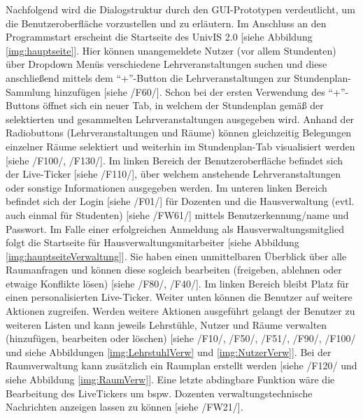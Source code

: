 Nachfolgend wird die Dialogstruktur durch den GUI-Prototypen verdeutlicht, um die Benutzeroberfläche vorzustellen und zu erläutern.
Im Anschluss an den Programmstart erscheint die Startseite des UnivIS 2.0 [siehe Abbildung \ref{img:hauptseite}]. Hier können unangemeldete Nutzer (vor allem Stundenten) über Dropdown Menüs verschiedene Lehrveranstaltungen suchen und diese anschließend mittels dem "`+"'-Button die Lehrveranstaltungen zur Stundenplan-Sammlung hinzufügen  [siehe /F60/]. Schon bei der ersten Verwendung des "`+"'-Buttons öffnet sich ein neuer Tab, in welchem der Stundenplan gemäß der selektierten und gesammelten Lehrveranstaltungen ausgegeben wird. Anhand der Radiobuttons (Lehrveranstaltungen und Räume) können gleichzeitig Belegungen einzelner Räume selektiert und weiterhin im Stundenplan-Tab visualisiert werden [siehe /F100/, /F130/].
Im linken Bereich der Benutzeroberfläche befindet sich der Live-Ticker [siehe /F110/], über welchem anstehende Lehrveranstaltungen oder sonstige Informationen ausgegeben werden.
Im unteren linken Bereich befindet sich der Login [siehe /F01/] für Dozenten und die Hausverwaltung (evtl. auch einmal für Studenten) [siehe /FW61/] mittels Benutzerkennung/name und Passwort.
Im Falle einer erfolgreichen Anmeldung als Hausverwaltungsmitglied folgt die Startseite für Hausverwaltungsmitarbeiter [siehe Abbildung \ref{img:hauptseiteVerwaltung}]. 
Sie haben einen unmittelbaren Überblick über alle Raumanfragen und können diese sogleich bearbeiten (freigeben, ablehnen oder etwaige Konflikte lösen) [siehe /F80/, /F40/].
Im linken Bereich bleibt Platz für einen personalisierten Live-Ticker. Weiter unten können die Benutzer auf weitere Aktionen zugreifen.
Werden weitere Aktionen ausgeführt gelangt der Benutzer zu weiteren Listen und kann jeweils Lehrstühle, Nutzer und Räume verwalten (hinzufügen, bearbeiten oder löschen) [siehe /F10/, /F50/, /F51/, /F90/, /F100/ und siehe Abbildungen \ref{img:LehrstuhlVerw} und \ref{img:NutzerVerw}]. Bei der Raumverwaltung kann zusätzlich ein Raumplan erstellt werden [siehe /F120/ und siehe Abbildung \ref{img:RaumVerw}].
Eine letzte abdingbare Funktion wäre die Bearbeitung des LiveTickers um bspw. Dozenten verwaltungstechnische Nachrichten anzeigen lassen zu können [siehe /FW21/].
